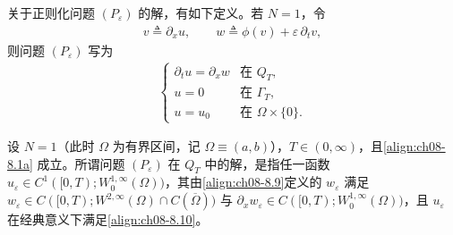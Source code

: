 \documentclass[../../main.tex]{subfiles}%
\begin{document}
关于正则化问题 $(P_\varepsilon)$ 的解，有如下定义。若 $N=1$，令
\begin{align}
v\triangleq \partial_x u,\qquad w\triangleq \phi(v)+\varepsilon\,\partial_t v, \label{align:ch08-8.9}
\end{align}
则问题 $(P_\varepsilon)$ 写为
\begin{align}
\begin{cases}
\partial_t u=\partial_x w & \text{在 }Q_T,\\
u=0 & \text{在 }\Gamma_T,\\
u=u_0 & \text{在 }\Omega\times\{0\}.
\end{cases} 
\label{align:ch08-8.10}
\end{align}

\begin{definition}[$N=1$ 时 $(P_\varepsilon)$ 的解]\label{definition:ch08-正则化解N1}
设 $N=1$（此时 $\Omega$ 为有界区间，记 $\Omega\equiv(a,b)$），$T\in(0,\infty)$，且\eqref{align:ch08-8.1a} 成立。所谓问题 $(P_\varepsilon)$ 在 $Q_T$ 中的解，是指任一函数 $u_\varepsilon\in C^1([0,T);W^{1,\infty}_0(\Omega))$，其由\eqref{align:ch08-8.9}定义的 $w_\varepsilon$ 满足 $w_\varepsilon\in C([0,T);W^{2,\infty}(\Omega)\cap C(\overline\Omega))$ 与 $\partial_x w_\varepsilon\in C([0,T);W^{1,\infty}_0(\Omega))$，且 $u_\varepsilon$ 在经典意义下满足\eqref{align:ch08-8.10}。
\end{definition}
\end{document}
